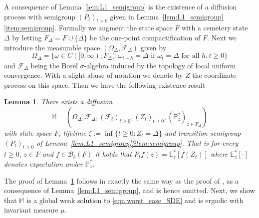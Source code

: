 \documentclass{article}
\theoremstyle{plain}
\newtheorem{lem}{Lemma}
\theoremstyle{definition}
\renewcommand{\P}{\mathbb{P}}
\newcommand{\E}{\mathbb{E}}
\newcommand{\Bcal}{{\mathcal B}}
\newcommand{\Fcal}{{\mathcal F}}
\numberwithin{lem}{section}
\begin{document}
A consequence of Lemma~\ref{lem:L1_semigroup} is the existence of a diffusion process with semigroup $(P_t)_{t > 0}$ given in Lemma~\ref{lem:L1_semigroup}\ref{item:semigroup}. Formally we augment the state space $F$ with a cemetery state $\Delta$ by letting $F_\Delta = F \cup \{\Delta\}$ be the one-point compactification of $F$. Next we introduce the measurable space $(\Omega_\Delta,\Fcal_\Delta)$ given by
\[\Omega_\Delta = \{\omega \in C([0,\infty);F_\Delta): \omega_{t+h} = \Delta \text{ if } \omega_t = \Delta \text{ for all } h,t\geq 0\}\] 
and $\Fcal_\Delta$ being the Borel $\sigma$-algebra induced by the topology of local uniform convergence. With a slight abuse of notation we denote by $Z$ the coordinate process on this space. Then we have the following existence result
\begin{lem} \label{lem:diffusion_existence}
    There exists a diffusion  
    \[\mathbb{M} = (\Omega_\Delta,\Fcal_\Delta,(\Fcal_t)_{t \geq 0},(Z_t)_{t \geq 0},(\P^*_z)_{z \in F_\Delta})\]
    with state space $F$, lifetime $\zeta := \inf\{t \geq 0:Z_t = \Delta\}$ and transition semigroup $(P_t)_{t \geq 0}$ of Lemma~\ref{lem:L1_semigroup}\ref{item:semigroup}. That is for every $t \geq 0, \, z \in F$ and $f \in \Bcal_b(F)$ it holds that $P_tf(z) =  \E^*_z[f(Z_t)]$ where $\E^*_z[\cdot]$ denotes expectation under $\P^*_z$.
\end{lem}
The proof of Lemma~\ref{lem:diffusion_existence} follows in exactly the same way as the proof of \cite[Lemma~C.3]{itkin2025ergodic}, as a consequence of Lemma~\ref{lem:L1_semigroup}, and is hence omitted. Next, we show that $\mathbb{M}$ is a global weak solution to \eqref{eqn:worst_case_SDE} and is ergodic with invariant measure $\mu$.
\end{document}
